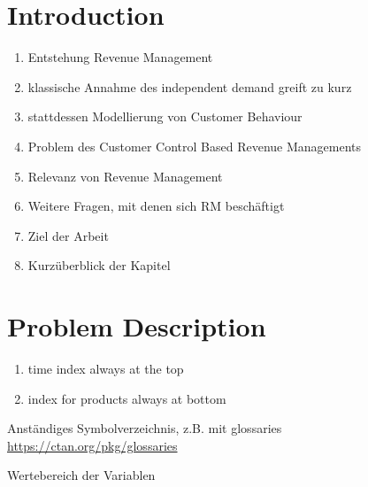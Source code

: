 \documentclass[
fontsize=12pt, %
paper=a4, %
headsepline, %
chapterprefix, %
numbers=noenddot, %
listof=totoc, %
index=totoc, %
bibliography=totoc, %
]%
{scrbook}%
\begin{document}


\section{Introduction}
\begin{enumerate}[noitemsep]
	\item Entstehung Revenue Management
	\item klassische Annahme des independent demand greift zu kurz
	\item stattdessen Modellierung von Customer Behaviour
	\item Problem des Customer Control Based Revenue Managements
	\item Relevanz von Revenue Management
	\item Weitere Fragen, mit denen sich RM beschäftigt
	\item Ziel der Arbeit
	\item Kurzüberblick der Kapitel
\end{enumerate}

\section{Problem Description}
\begin{boxStefan}
	\begin{enumerate}
		\item time index always at the top
		\item index for products always at bottom
	\end{enumerate}
	
	Anständiges Symbolverzeichnis, z.B. mit glossaries \url{https://ctan.org/pkg/glossaries}
	
	Wertebereich der Variablen
\end{boxStefan}
\end{document}
